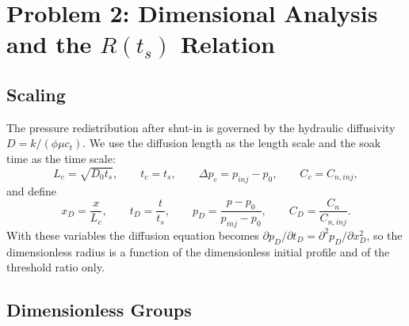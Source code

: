 \section{Problem 2: Dimensional Analysis and the $R(t_s)$ Relation}

\subsection{Scaling}

The pressure redistribution after shut-in is governed by the hydraulic
diffusivity $D=k/(\phi\mu c_t)$. We use the diffusion length as the length
scale and the soak time as the time scale:
\begin{equation}
L_c=\sqrt{D_0t_s},\qquad t_c=t_s,\qquad
\Delta p_c=p_{inj}-p_0,\qquad C_c=C_{n,inj},
\label{eq:scales}
\end{equation}
and define
\begin{equation}
x_D=\frac{x}{L_c},\qquad t_D=\frac{t}{t_s},\qquad
p_D=\frac{p-p_0}{p_{inj}-p_0},\qquad C_D=\frac{C_n}{C_{n,inj}} .
\label{eq:dimless}
\end{equation}
With these variables the diffusion equation becomes
$\partial p_D/\partial t_D=\partial^2p_D/\partial x_D^2$, so the
dimensionless radius is a function of the dimensionless initial profile and of
the threshold ratio only.

\subsection{Dimensionless Groups}

